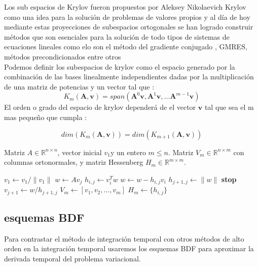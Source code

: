 \documentclass[11pt, spanish]{article}
\begin{document}
 Los sub espacios de Krylov fueron propuestos por Aleksey Nikolaevich Krylov como una idea para la soluci\'on de problemas de valores propios y al d\'ia de hoy mediante estas proyecciones de subespacios ortogonales se han logrado construir m\'etodos que son esenciales para la soluci\'on de todo tipos de sistemas de ecuaciones lineales como elo son el m\'etodo del gradiente conjugado , GMRES, m\'etodos precondicionados entre otros \cite{.ch1}\\ 

Podemos definir los subespacios de krylov como el espacio generado por la combinaci\'on de las bases linealmente independientes dadas por la multiplicaci\'on de una matriz de potencias y un vector tal que :
\begin{equation}
    K_m(\textbf{A},\textbf{v})=span(\textbf{A}^0 \textbf{v},\textbf{A}^1\textbf{v}, ... \textbf{A}^{m-1} \textbf{v} )
    \label{krylov}
\end{equation}
El orden o grado del espacio de krylov depender\'a de el vector $\textbf{v}$ tal que sea el m mas pequeño que cumpla\cite{Sogabe2022} :

\begin{equation}
    dim(K_m(\textbf{A},\textbf{v}))= dim(K_{m+1}(\textbf{A},\textbf{v}))
\end{equation}



\begin{algorithm}
\caption{Algoritmo de Arnoldi}
\begin{algorithmic}[1]
\Require Matriz \( A \in \mathbb{R}^{n \times n} \), vector inicial \( v_1 \)y un entero \( m \leq n \).
\Ensure Matriz \( V_m \in \mathbb{R}^{n \times m} \) con columnas ortonormales, y matriz Hessenberg \( H_m \in \mathbb{R}^{m \times m} \).

\State $v_1 \gets v_1 / \|v_1\|$
    \State $w \gets A v_j$
        \State $h_{i,j} \gets v_i^T w$
        \State $w \gets w - h_{i,j} v_i$
    \EndFor
        \State $h_{j+1,j} \gets \|w\|$
            \State \textbf{stop}
        \EndIf
        \State $v_{j+1} \gets w / h_{j+1,j}$
    \EndIf
\EndFor
\State $V_m \gets [v_1, v_2, \ldots, v_m]$
\State $H_m \gets \{h_{i,j}\}$

\end{algorithmic}
\end{algorithm}


\subsection{esquemas BDF }
Para contrastar el m\'etodo de integraci\'on temporal con otros m\'etodos de alto orden en la integraci\'on temporal usaremos los esquemas BDF para aproximar la derivada temporal del problema variacional.\\
 
\end{document}
